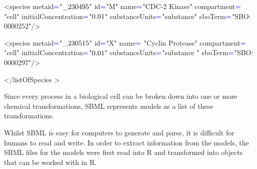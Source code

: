 \documentclass[portrait,a0paper,fontscale=0.35]{baposter}
\begin{document}
\begin{poster}
{\begin{flushleft}
{{ <\color{red}species metaid$\color{blue}=$\color{blue}"$\color{black}\_230495$\color{blue}" \color{red} id$\color{blue}=$\color{blue}"\color{black}M\color{blue}" \color{red} name$\color{blue}=$\color{blue}"\color{black}CDC-2 Kinase\color{blue}" \color{red} compartment$\color{blue}=$\color{blue}"\color{black}cell\color{blue}" \color{red} initialConcentration$\color{blue}=$\color{blue}"$\color{black}0.01$\color{blue}" \color{red} substanceUnits$\color{blue}=$\color{blue}"\color{black}substance\color{blue}" \color{red} sboTerm$\color{blue}=$\color{blue}"\color{black}SBO:$0000252$\color{blue}"/>
 
 <\color{red}species metaid$\color{blue}=$\color{blue}"$\color{black}\_230515$\color{blue}" \color{red} id$\color{blue}=$\color{blue}"\color{black}X\color{blue}" \color{red} name$ \color{blue}=$ \color{blue} "\color{black}Cyclin Protease\color{blue}" \color{red} compartment$\color{blue}=$\color{blue}"\color{black}cell\color{blue}" \color{red} initialConcentration$\color{blue}=$\color{blue}"$\color{black} 0.01$\color{blue}" \color{red} substanceUnits$\color{blue}=$\color{blue}"\color{black}substance \color{blue}" \color{red} sboTerm$\color{blue}=$\color{blue}"\color{black}SBO:$0000297$\color{blue}"/>
 
 <\color{red}/listOfSpecies \color{blue}>}}
 \end{flushleft}
 
 Since every process in a biological cell can be broken down into one or more chemical transformations, SBML represents models as a list of these transformations. 
 
 Whilst SBML is easy for computers to generate and parse, it is difficult for humans to read and write. In order to extract information from the models, the SBML files for the models were first read into R and transformed into objects that can be worked with in R.
 }
 
\end{poster}
\end{document}
